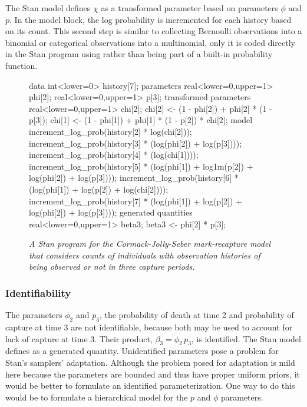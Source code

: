 The Stan model defines $\chi$ as a transformed parameter based on
parameters $\phi$ and $p$.  In the model block, the log probability is
incremented for each history based on its count.  This second step is
similar to collecting Bernoulli observations into a binomial or
categorical observations into a multinomial, only it is coded directly
in the Stan program using  rather than
being part of a built-in probability function.
%
\begin{figure}
\begin{stancode}
data {
  int<lower=0> history[7];
}
parameters {
  real<lower=0,upper=1> phi[2];
  real<lower=0,upper=1> p[3];
}
transformed parameters {
  real<lower=0,upper=1> chi[2];  
  chi[2] <- (1 - phi[2]) + phi[2] * (1 - p[3]);
  chi[1] <- (1 - phi[1]) + phi[1] * (1 - p[2]) * chi[2];
}
model {
  increment_log_prob(history[2] * log(chi[2]));
  increment_log_prob(history[3] * (log(phi[2]) + log(p[3])));
  increment_log_prob(history[4] * (log(chi[1])));
  increment_log_prob(history[5] 
                     * (log(phi[1]) + log1m(p[2])
                        + log(phi[2]) + log(p[3])));
  increment_log_prob(history[6] 
                     * (log(phi[1]) + log(p[2]) 
                        + log(chi[2])));
  increment_log_prob(history[7] 
                     * (log(phi[1]) + log(p[2]) 
                        + log(phi[2]) + log(p[3])));
}
generated quantities {
  real<lower=0,upper=1> beta3;
  beta3 <- phi[2] * p[3];
}
\end{stancode}
\vspace*{-12pt}
\caption{\small\it A Stan program for the Cormack-Jolly-Seber
  mark-recapture model that considers counts of individuals with
  observation histories of being observed or not in three capture
  periods.}\label{cjs-history.figure}
\end{figure}
%

\subsubsection{Identifiability}

The parameters $\phi_2$ and $p_3$, the probability of death at time 2
and probability of capture at time 3 are not identifiable, because both
may be used to account for lack of capture at time 3.  Their product,
$\beta_3 = \phi_2 \, p_3$, is identified.  The Stan model defines
 as a generated quantity.  Unidentified parameters pose a
problem for Stan's samplers' adaptation.  Although the problem posed
for adaptation is mild here because the parameters are bounded and
thus have proper uniform priors, it would be better to formulate an
identified parameterization.  One way to do this would be to formulate
a hierarchical model for the $p$ and $\phi$ parameters.

